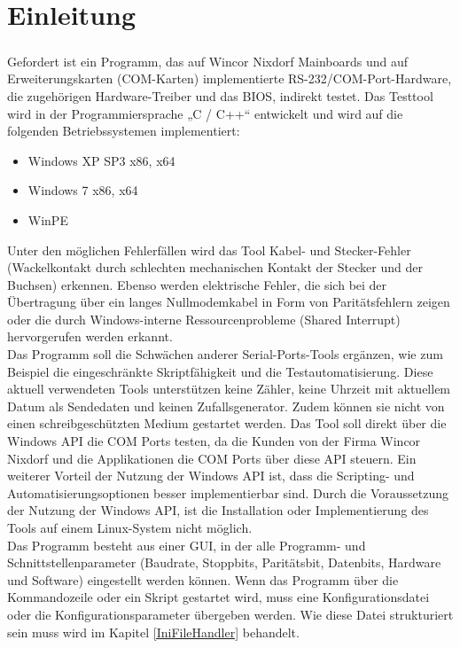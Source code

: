 \chapter{Einleitung}\label{chp:einleitung}
\paragraph{}
Gefordert ist ein Programm, das auf Wincor Nixdorf Mainboards und auf Erweiterungskarten (COM-Karten) implementierte RS-232/COM-Port-Hardware, die zugehörigen Hardware-Treiber und das BIOS, indirekt testet. Das Testtool wird in der Programmiersprache „C / C++“ entwickelt und wird auf die folgenden Betriebssystemen implementiert:

\begin{itemize}
\item Windows XP SP3 x86, x64
\item Windows 7 x86, x64
\item  WinPE
\end{itemize}

Unter den möglichen Fehlerfällen wird das Tool Kabel- und Stecker-Fehler (Wackelkontakt durch schlechten mechanischen Kontakt der Stecker und der Buchsen) erkennen.
Ebenso werden elektrische Fehler, die sich bei der Übertragung über ein langes Nullmodemkabel in Form von Paritätsfehlern zeigen oder die durch Windows-interne Ressourcenprobleme (Shared Interrupt) hervorgerufen werden erkannt.\\

Das Programm soll die Schwächen anderer Serial-Ports-Tools ergänzen, wie zum Beispiel die eingeschränkte Skriptfähigkeit und die Testautomatisierung. Diese aktuell verwendeten Tools unterstützen keine Zähler, keine Uhrzeit mit aktuellem Datum als Sendedaten und keinen Zufallsgenerator. Zudem können sie nicht von einen schreibgeschützten Medium gestartet werden. Das Tool soll direkt über die Windows API die COM Ports testen, da die Kunden von der Firma Wincor Nixdorf und die Applikationen die COM Ports über diese API steuern. Ein weiterer Vorteil der Nutzung der Windows API ist, dass die Scripting- und Automatisierungsoptionen besser implementierbar sind. Durch die Voraussetzung der Nutzung der Windows API, ist die Installation oder Implementierung des Tools auf einem Linux-System nicht möglich.\\

Das Programm besteht aus einer GUI, in der alle Programm- und Schnittstellenparameter (Baudrate, Stoppbits, Paritätsbit, Datenbits, Hardware und Software) eingestellt werden können. Wenn das Programm über die Kommandozeile oder ein Skript gestartet wird, muss eine Konfigurationsdatei oder die Konfigurationsparameter übergeben werden. Wie diese Datei strukturiert sein muss wird im Kapitel \ref{IniFileHandler} behandelt.